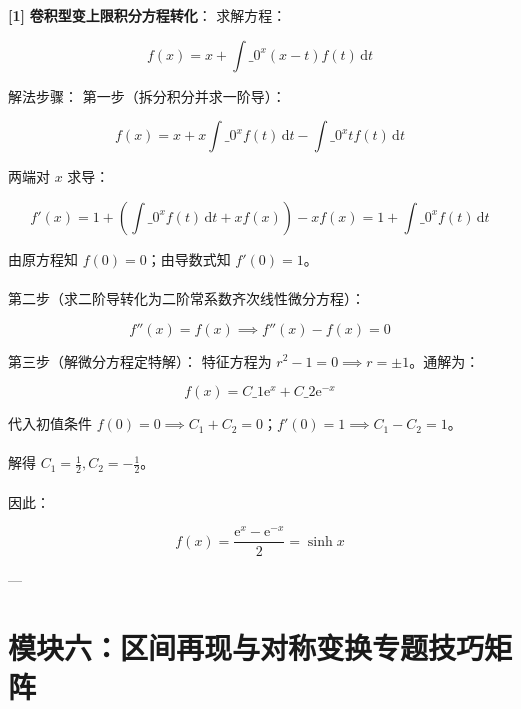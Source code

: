 \documentclass[11pt,a4paper,UTF8]{ctexart}
\begin{document}
\begin{solbox}[分步推导与答题规范]
\textbf{[1]}  \textbf{卷积型变上限积分方程转化}：
求解方程：

\begin{equation*}
f(x) = x + \int\_0^x (x - t)f(t)\,\mathrm{d}t
\end{equation*}

解法步骤：
第一步（拆分积分并求一阶导）：

\begin{equation*}
f(x) = x + x \int\_0^x f(t)\,\mathrm{d}t - \int\_0^x t f(t)\,\mathrm{d}t
\end{equation*}

两端对 $x$ 求导：

\begin{equation*}
f'(x) = 1 + \left( \int\_0^x f(t)\,\mathrm{d}t + x f(x) \right) - x f(x) = 1 + \int\_0^x f(t)\,\mathrm{d}t
\end{equation*}

由原方程知 $f(0) = 0$；由导数式知 $f'(0) = 1$。\\ \\
第二步（求二阶导转化为二阶常系数齐次线性微分方程）：

\begin{equation*}
f''(x) = f(x) \implies f''(x) - f(x) = 0
\end{equation*}

第三步（解微分方程定特解）：
特征方程为 $r^2 - 1 = 0 \implies r = \pm 1$。通解为：

\begin{equation*}
f(x) = C\_1 \mathrm{e}^x + C\_2 \mathrm{e}^{-x}
\end{equation*}

代入初值条件 $f(0) = 0 \implies C_1 + C_2 = 0$；$f'(0) = 1 \implies C_1 - C_2 = 1$。\\ \\
解得 $C_1 = \frac{1}{2}, C_2 = -\frac{1}{2}$。\\ \\
因此：

\begin{equation*}
f(x) = \frac{\mathrm{e}^x - \mathrm{e}^{-x}}{2} = \sinh x
\end{equation*}

\end{solbox}

---


\section{模块六：区间再现与对称变换专题技巧矩阵}
\end{document}
